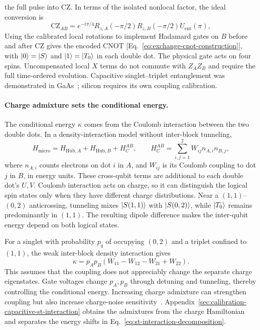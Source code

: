 the full pulse into CZ. In terms of the isolated nonlocal factor,
the ideal conversion is
\begin{equation}
 \mathrm{CZ}_{AB}
   =e^{-i\pi/4}R_{z,A}(-\pi/2)R_{z,B}(-\pi/2)
       U_{\mathrm{ent}}(\pi),
 \label{eq:st-cz-gate}
\end{equation}
Using the calibrated local rotations to implement Hadamard gates
on $B$ before and after CZ gives the encoded CNOT
[Eq.~\eqref{eq:exchange-cnot-construction}], with $\lvert 0\rangle=\lvert S\rangle$ and
$\lvert 1\rangle=\lvert T_0\rangle$ in each double dot.
The physical gate acts on four spins.
Uncompensated local $X$ terms do not commute with $Z_AZ_B$ and
require the full time-ordered evolution.
Capacitive singlet--triplet entanglement was demonstrated in
GaAs~\cite{Shulman2012}; silicon requires its own coupling calibration.

\paragraph{Charge admixture sets the conditional energy.}
The conditional energy $\kappa$ comes from the Coulomb interaction
between the two double dots. In a density-interaction model without
inter-block tunneling,
\begin{equation}
 H_{\mathrm{micro}}=H_{\mathrm{Hub},A}+H_{\mathrm{Hub},B}
                  +H_C^{AB},
 \qquad
 H_C^{AB}=\sum_{i,j=1}^{2}W_{ij}n_{A,i}n_{B,j},
 \label{eq:st-interblock-coulomb}
\end{equation}
where $n_{A,i}$ counts electrons on dot $i$ in $A$, and $W_{ij}$
is its Coulomb coupling to dot $j$ in $B$, in energy units.
These cross-qubit terms are additional to each double dot's $U,V$.
Coulomb interaction acts on charge, so it can distinguish the logical
spin states only when they have different charge distributions.
Near a $(1,1)$--$(0,2)$ anticrossing, tunneling mixes
$\lvert S(1,1)\rangle$ with $\lvert S(0,2)\rangle$, while $\lvert T_0\rangle$ remains
predominantly in $(1,1)$. The resulting dipole difference makes the
inter-qubit energy depend on both logical states.

For a singlet with probability $p_q$ of occupying $(0,2)$ and a
triplet confined to $(1,1)$, the weak inter-block density interaction
gives
\begin{equation}
 \kappa=p_Ap_B(W_{11}-W_{12}-W_{21}+W_{22}).
 \label{eq:platform-st-charge-coupling}
\end{equation}
This assumes that the coupling does not appreciably change the
separate charge eigenstates. Gate voltages change $p_A,p_B$ through
detuning and tunneling, thereby controlling the conditional energy.
Increasing charge admixture can strengthen coupling but also
increase charge-noise sensitivity~\cite{Burkard2023,Shulman2012}.
Appendix~\ref{sec:calibration-capacitive-st-interaction} obtains the
admixtures from the charge Hamiltonian and separates the energy
shifts in Eq.~\eqref{eq:st-interaction-decomposition}.

